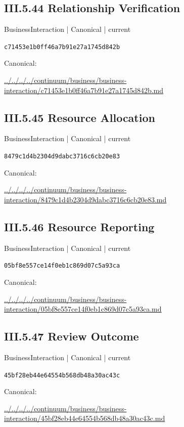 \documentclass[10pt,a4paper]{article}
\begin{document}
\subsection*{III.5.44 Relationship Verification}
\label{element-c71453e1b0ff46a7b91e27a1745d842b}
{\small BusinessInteraction | Canonical | current}\par
\texttt{c71453e1b0ff46a7b91e27a1745d842b}\par
Canonical: \par
{\footnotesize\url{../../../../continuum/business/business-interaction/c71453e1b0ff46a7b91e27a1745d842b.md}}\par
\subsection*{III.5.45 Resource Allocation}
\label{element-8479c1d4b2304d9dabc3716c6cb20e83}
{\small BusinessInteraction | Canonical | current}\par
\texttt{8479c1d4b2304d9dabc3716c6cb20e83}\par
Canonical: \par
{\footnotesize\url{../../../../continuum/business/business-interaction/8479c1d4b2304d9dabc3716c6cb20e83.md}}\par
\subsection*{III.5.46 Resource Reporting}
\label{element-05bf8e557ce14f0eb1c869d07c5a93ca}
{\small BusinessInteraction | Canonical | current}\par
\texttt{05bf8e557ce14f0eb1c869d07c5a93ca}\par
Canonical: \par
{\footnotesize\url{../../../../continuum/business/business-interaction/05bf8e557ce14f0eb1c869d07c5a93ca.md}}\par
\subsection*{III.5.47 Review Outcome}
\label{element-45bf28eb44e64554b568db48a30ac43c}
{\small BusinessInteraction | Canonical | current}\par
\texttt{45bf28eb44e64554b568db48a30ac43c}\par
Canonical: \par
{\footnotesize\url{../../../../continuum/business/business-interaction/45bf28eb44e64554b568db48a30ac43c.md}}\par
\end{document}
